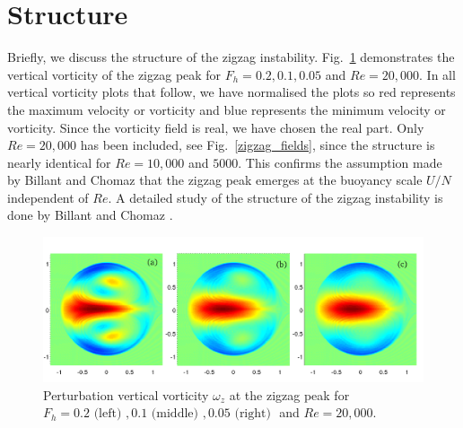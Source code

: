 \section{Structure} 
Briefly, we discuss the structure of the zigzag instability. Fig.~\ref{zigzag_vorticity} demonstrates the vertical vorticity of the zigzag peak for $F_{h}=0.2,0.1,0.05$ and $Re=20{,}000$. In all vertical vorticity plots that follow, we have normalised the plots so red represents the maximum velocity or vorticity and blue represents the minimum velocity  or vorticity. Since the vorticity field is real, we have chosen the real part. Only $Re=20{,}000$ has been included, see Fig.~\ref{zigzag_fields}, since the structure is nearly identical for $Re=10{,}000$ and $5000$. This confirms the assumption made by Billant and Chomaz \cite{bc2000b} that the zigzag peak emerges at the buoyancy scale $U/N$ independent of $Re$. A detailed study of the structure of the zigzag instability is done by Billant and Chomaz \cite{bc2000c}. 
\begin{figure} 
\begin{center}
\includegraphics[width=\textwidth]{vorticity_zigzag}
\caption{Perturbation vertical vorticity $\omega_{z}$ at the zigzag peak for $F_{h}=0.2 \text{ (left) }, 0.1 \text{ (middle) }, 0.05 \text{ (right) }$ and $Re=20{,}000$.}
\label{zigzag_vorticity}
\end{center}
\end{figure} 
